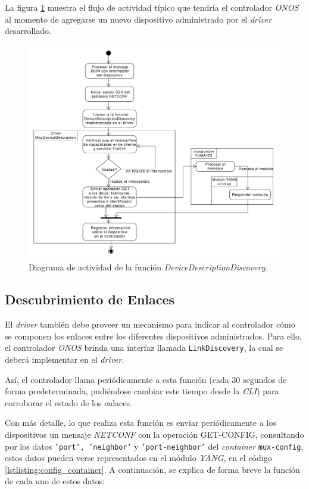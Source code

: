     La figura \ref{fig:actividad_driver_descr} muestra el flujo de actividad típico que tendría el controlador \textit{ONOS} al momento de agregarse un nuevo dispositivo administrado por el \textit{driver} desarrollado.
    
    \begin{figure}[H]
        \centering
        \includegraphics[scale=0.45]{Figures/actividad_driver_descr.pdf}
        \caption{Diagrama de actividad de la función \textit{DeviceDescriptionDiscovery}.}
        \label{fig:actividad_driver_descr}
      \end{figure}

\subsection{Descubrimiento de Enlaces} \label{driverlink}

El \textit{driver} también debe proveer un mecanismo para indicar al controlador cómo se componen los enlaces entre los diferentes dispositivos administrados. Para ello, el controlador \textit{ONOS} brinda una interfaz llamada \texttt{LinkDiscovery}, la cual se deberá implementar en el \textit{driver}. 

Así, el controlador llama periódicamente a esta función (cada 30 segundos de forma predeterminada, pudiéndose cambiar este tiempo desde la \textit{CLI}) para corroborar el estado de los enlaces. 

Con más detalle, lo que realiza esta función es enviar periódicamente a los dispositivos un mensaje \textit{NETCONF} con la operación GET-CONFIG, consultando por los datos \texttt{'port', 'neighbor'} y \texttt{'port-neighbor'} del \textit{container} \texttt{mux-config}, estos datos pueden verse representados en el módulo \textit{YANG}, en el código \ref{lstlisting:config_container}. A continuación, se explica de forma breve la función de cada uno de estos datos:


